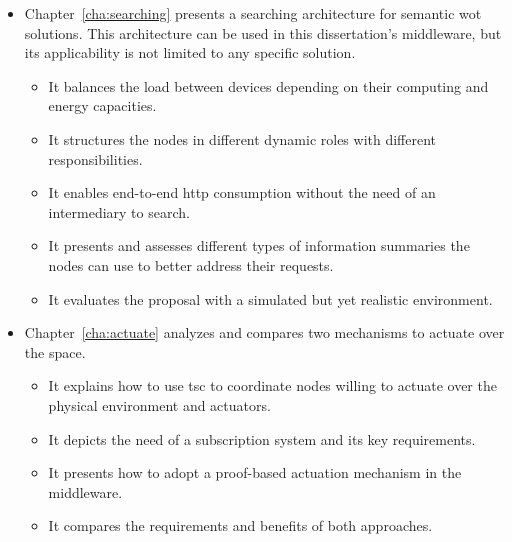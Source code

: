 \begin{itemize}
  \item Chapter~\ref{cha:searching} presents a searching architecture for semantic \ac{wot} solutions.
        This architecture can be used in this dissertation's middleware, but its applicability is not limited to any specific solution.
    \begin{itemize}
      \item It balances the load between devices depending on their computing and energy capacities.
      \item It structures the nodes in different dynamic roles with different responsibilities. %
      \item It enables end-to-end \ac{http} consumption without the need of an intermediary to search. %
      \item It presents and assesses different types of information summaries the nodes can use to better address their requests.
      \item It evaluates the proposal with a simulated but yet realistic environment.
    \end{itemize}
    
  \item Chapter~\ref{cha:actuate} analyzes and compares two mechanisms to actuate over the space. %
    \begin{itemize}
      \item It explains how to use \ac{tsc} to coordinate nodes willing to actuate over the physical environment and actuators.
      \item It depicts the need of a subscription system and its key requirements.
      \item It presents how to adopt a proof-based actuation mechanism in the middleware.
      \item It compares the requirements and benefits of both approaches.
    \end{itemize}
  

\end{itemize}
